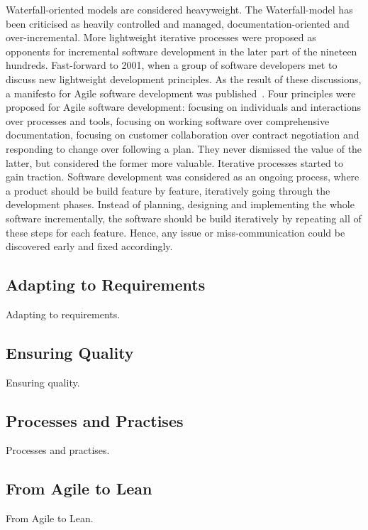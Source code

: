 \documentclass[english]{tktltiki2}
\begin{document}
Waterfall-oriented models are considered heavyweight. The Waterfall-model has been criticised as heavily controlled and managed, documentation-oriented and over-incremental. More lightweight iterative processes were proposed as opponents for incremental software development in the later part of the nineteen hundreds. Fast-forward to 2001, when a group of software developers met to discuss new lightweight development principles. As the result of these discussions, a manifesto for Agile software development was published~\cite{BBB01}. Four principles were proposed for Agile software development: focusing on individuals and interactions over processes and tools, focusing on working software over comprehensive documentation, focusing on customer collaboration over contract negotiation and responding to change over following a plan. They never dismissed the value of the latter, but considered the former more valuable. Iterative processes started to gain traction. Software development was considered as an ongoing process, where a product should be build feature by feature, iteratively going through the development phases. Instead of planning, designing and implementing the whole software incrementally, the software should be build iteratively by repeating all of these steps for each feature. Hence, any issue or miss-communication could be discovered early and fixed accordingly.

\subsection{Adapting to Requirements}

Adapting to requirements.

\subsection{Ensuring Quality}

Ensuring quality.

\subsection{Processes and Practises}

Processes and practises.

\subsection{From Agile to Lean}

From Agile to Lean.
\end{document}
